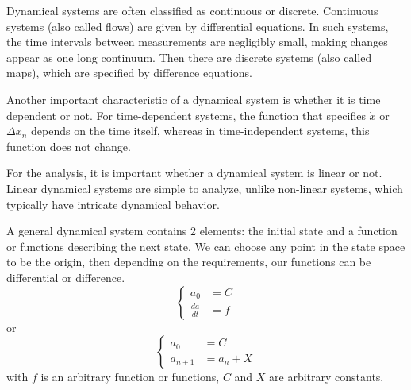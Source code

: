 \documentclass[a4paper]{article}
\begin{document}
Dynamical systems are often classified as continuous or discrete.
Continuous systems (also called flows) are given by differential equations.
In such systems, the time intervals between measurements are negligibly small, making changes appear as one long continuum.
Then there are discrete systems (also called maps), which are specified by difference equations.

Another important characteristic of a dynamical system is whether it is time dependent or not.
For time-dependent systems, the function that specifies \(\dot{x}\) or \(\Delta{x_n}\) depends on the time itself, whereas in time-independent systems, this function does not change.

For the analysis, it is important whether a dynamical system is linear or not.
Linear dynamical systems are simple to analyze, unlike non-linear systems, which typically have intricate dynamical behavior.

A general dynamical system contains 2 elements: the initial state and a function or functions describing the next state.
We can choose any point in the state space to be the origin, then depending on the requirements, our functions can be differential or difference.
\begin{equation}
  \begin{cases}
    a_0           & = C \\
    \frac{da}{dt} & = f
  \end{cases}
\end{equation}
or
\begin{equation}
  \begin{cases}
    a_0       & = C       \\
    a_{n + 1} & = a_n + X
  \end{cases}
\end{equation}
with \(f\) is an arbitrary function or functions, \(C\) and \(X\) are arbitrary constants.
\end{document}
